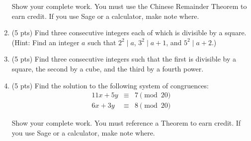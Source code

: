 \documentclass[12pt]{article}
\begin{document}
\begin{enumerate}
		Show your complete work. You must use the Chinese Remainder Theorem to earn credit. If you use Sage or a calculator, make note where.
		\vfill
	\item (5 pts) Find three consecutive integers each of which is divisible by a square.
		(Hint: Find an integer $a$ such that $2^2\mid a$, $3^2\mid a+1$, and $5^2\mid a+2$.)
		\vfill
		\newpage
	\item (5 pts) Find three consecutive integers such that the first is divisible by a square, the second by a cube, and the third by a fourth power.
		\vfill
	\item (5 pts) Find the solution to the following system of congruences:
			\begin{eqnarray*}11x+5y&\equiv& 7\pmod{20}\\6x+3y&\equiv& 8\pmod{20}\end{eqnarray*}
		
		Show your complete work. You must reference a Theorem to earn credit. If you use Sage or a calculator, make note where.
		\vfill
\end{enumerate}
		
\end{document}
